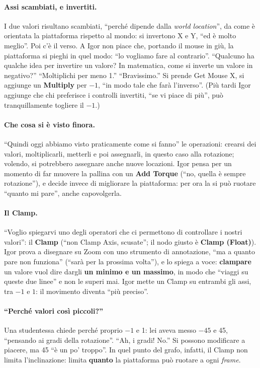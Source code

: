 \paragraph{Assi scambiati, e invertiti.} I due valori risultano scambiati, ``perché
dipende dalla \emph{world location}'', da come è orientata la piattaforma rispetto al
mondo: si invertono X e Y, ``ed è molto meglio''. Poi c'è il verso. A Igor non piace
che, portando il mouse in giù, la piattaforma si pieghi in quel modo: ``lo vogliamo fare
al contrario''. ``Qualcuno ha qualche idea per invertire un valore? In matematica, come
si inverte un valore in negativo?'' ``Moltiplichi per meno 1.'' ``Bravissimo.'' Si prende
Get Mouse X, si aggiunge un \textbf{Multiply} per $-1$, ``in modo tale che farà
l'inverso''. (Più tardi Igor aggiunge che chi preferisce i controlli invertiti, ``se vi
piace di più'', può tranquillamente togliere il $-1$.)

\paragraph{Che cosa si è visto finora.} ``Quindi oggi abbiamo visto praticamente come si
fanno'' le operazioni: crearsi dei valori, moltiplicarli, metterli e poi assegnarli, in
questo caso alla rotazione; volendo, si potrebbero assegnare anche nuove locazioni.
Igor pensa per un momento di far muovere la pallina con un \textbf{Add Torque} (``no,
quella è sempre rotazione''), e decide invece di migliorare la piattaforma: per ora la si
può ruotare ``quanto mi pare'', anche capovolgerla.

\paragraph{Il Clamp.} ``Voglio spiegarvi uno degli operatori che ci permettono di
controllare i nostri valori'': il \textbf{Clamp} (``non Clamp Axis, scusate''; il nodo
giusto è \textbf{Clamp (Float)}). Igor prova a disegnare su Zoom con uno strumento di
annotazione, ``ma a quanto pare non funziona'' (``sarà per la prossima volta''), e lo
spiega a voce: \textbf{clampare} un valore vuol dire dargli \textbf{un minimo e un
massimo}, in modo che ``viaggi su queste due linee'' e non le superi mai. Igor mette un
Clamp su entrambi gli assi, tra $-1$ e $1$: il movimento diventa ``più preciso''.

\paragraph{``Perché valori così piccoli?''} Una studentessa chiede perché proprio $-1$ e 1:
lei aveva messo $-45$ e 45, ``pensando ai gradi della rotazione''. ``Ah, i gradi! No.''
Si possono modificare a piacere, ma 45 ``è un po' troppo''. In quel punto del grafo,
infatti, il Clamp non limita l'inclinazione: limita \textbf{quanto} la piattaforma può
ruotare a ogni \emph{frame}.


